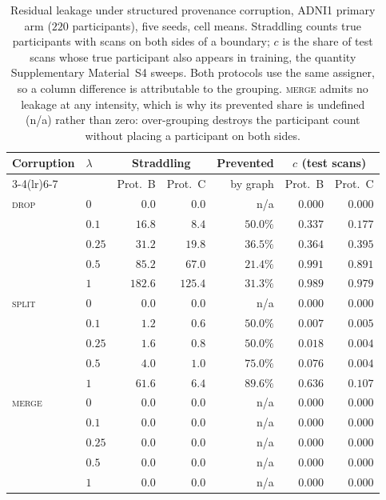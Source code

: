 \documentclass[pdflatex,sn-vancouver-num]{sn-jnl}
\begin{document}
\begin{table}[!tb]
\centering
\small
\caption{Residual leakage under structured provenance corruption, ADNI1
primary arm ($220$ participants), five seeds, cell means. Straddling counts
true participants with scans on both sides of a boundary; $c$ is the share
of test scans whose true participant also appears in training, the quantity
Supplementary Material~S4 sweeps. Both protocols use the same assigner, so a column
difference is attributable to the grouping. \textsc{merge} admits no leakage at any
intensity, which is why its prevented share is undefined (n/a) rather than zero:
over-grouping destroys the participant count without placing a participant
on both sides.}
\label{tab:stress_structural}
\begin{tabular}{@{}llrrrrr@{}}
\toprule
\textbf{Corruption} & $\lambda$ & \multicolumn{2}{c}{\textbf{Straddling}}
 & \textbf{Prevented} & \multicolumn{2}{c}{\textbf{$c$ (test scans)}} \\
\cmidrule(lr){3-4}\cmidrule(lr){6-7}
 & & Prot.~B & Prot.~C & by graph & Prot.~B & Prot.~C \\
\midrule
\textsc{drop} & $0$ & $0.0$ & $0.0$ & n/a & $0.000$ & $0.000$ \\
 & $0.1$ & $16.8$ & $8.4$ & $50.0\%$ & $0.337$ & $0.177$ \\
 & $0.25$ & $31.2$ & $19.8$ & $36.5\%$ & $0.364$ & $0.395$ \\
 & $0.5$ & $85.2$ & $67.0$ & $21.4\%$ & $0.991$ & $0.891$ \\
 & $1$ & $182.6$ & $125.4$ & $31.3\%$ & $0.989$ & $0.979$ \\
\addlinespace
\textsc{split} & $0$ & $0.0$ & $0.0$ & n/a & $0.000$ & $0.000$ \\
 & $0.1$ & $1.2$ & $0.6$ & $50.0\%$ & $0.007$ & $0.005$ \\
 & $0.25$ & $1.6$ & $0.8$ & $50.0\%$ & $0.018$ & $0.004$ \\
 & $0.5$ & $4.0$ & $1.0$ & $75.0\%$ & $0.076$ & $0.004$ \\
 & $1$ & $61.6$ & $6.4$ & $89.6\%$ & $0.636$ & $0.107$ \\
\addlinespace
\textsc{merge} & $0$ & $0.0$ & $0.0$ & n/a & $0.000$ & $0.000$ \\
 & $0.1$ & $0.0$ & $0.0$ & n/a & $0.000$ & $0.000$ \\
 & $0.25$ & $0.0$ & $0.0$ & n/a & $0.000$ & $0.000$ \\
 & $0.5$ & $0.0$ & $0.0$ & n/a & $0.000$ & $0.000$ \\
 & $1$ & $0.0$ & $0.0$ & n/a & $0.000$ & $0.000$ \\
\bottomrule
\end{tabular}
\end{table}
\end{document}
